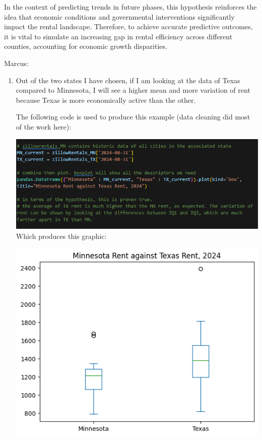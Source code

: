 \documentclass[a4paper]{article}
\begin{document}
\begin{enumerate}
\begin{enumerate}
    In the context of predicting trends in future phases, this hypothesis reinforces the idea that economic conditions and governmental interventions significantly impact the rental landscape. Therefore, to achieve accurate predictive outcomes, it is vital to simulate an increasing gap in rental efficiency across different counties, accounting for economic growth disparities.
    
\end{enumerate}


  Marcus:

  \begin{enumerate}
    \item Out of the two states I have chosen, if I am looking at the data of Texas compared to Minnesota, I will see a higher mean and more variation of rent because Texas is more economically active than the other.
    
    The following code is used to produce this example (data cleaning did most of the work here): 

    \includegraphics[scale=0.75]{Marcus-Hypothesis-1-code.png}
    \bigbreak
    Which produces this graphic: 

    \includegraphics[scale=0.9]{Marcus-Hypothesis-1.png}


\end{enumerate}
\end{enumerate}
\end{document}
